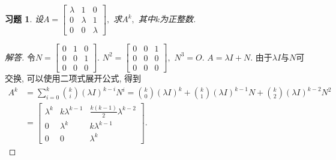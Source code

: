 \documentclass[UTF8]{ctexart}
\newtheorem{ex}[thm]{习题}
\begin{document}
\begin{ex}
设$A = \begin{bmatrix}
				\lambda & 1 & 0 \\ 0 & \lambda & 1 \\ 0 & 0 & \lambda
			\end{bmatrix},$ 求$A^k,$ 其中$k$为正整数.
\end{ex}
\begin{proof}[解答]
令$N = \begin{bmatrix}
				0 & 1 & 0 \\ 0 & 0 & 1 \\ 0 & 0 & 0
			\end{bmatrix}.$ $N^2 = \begin{bmatrix}
				0 & 0 & 1 \\ 0 & 0 & 0 \\ 0 & 0 & 0
			\end{bmatrix},$ $N^3 = O.$ $A = \lambda I + N.$ 由于$\lambda I $与$N$可交换, 可以使用二项式展开公式, 得到
\begin{align*}
A^k & = \sum_{i=0}^k \binom{k}{i}(\lambda I)^{k-i}N^i = \binom{k}{0}(\lambda I)^{k}+\binom{k}{1}(\lambda I)^{k-1}N + \binom{k}{2}(\lambda I)^{k-2}N^2\\
& = \begin{bmatrix}
				\lambda^k & k\lambda^{k-1} & \frac{k(k-1)}{2}\lambda^{k-2} \\ 0 & \lambda^k & k\lambda^{k-1} \\ 0 & 0 & \lambda^k
			\end{bmatrix}.
\end{align*}
\end{proof}
\end{document}
